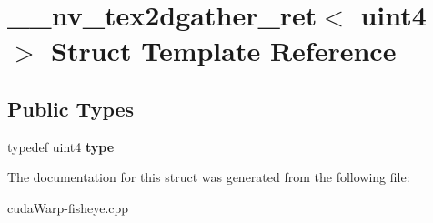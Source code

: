\hypertarget{struct____nv__tex2dgather__ret_3_01uint4_01_4}{}\section{\+\_\+\+\_\+nv\+\_\+tex2dgather\+\_\+ret$<$ uint4 $>$ Struct Template Reference}
\label{struct____nv__tex2dgather__ret_3_01uint4_01_4}
\subsection*{Public Types}
\begin{DoxyCompactItemize}
\item 
typedef uint4 {\bfseries type}\hypertarget{struct____nv__tex2dgather__ret_3_01uint4_01_4_a99f61127a9d0db131eefbe52e16344e8}{}\label{struct____nv__tex2dgather__ret_3_01uint4_01_4_a99f61127a9d0db131eefbe52e16344e8}

\end{DoxyCompactItemize}


The documentation for this struct was generated from the following file\+:\begin{DoxyCompactItemize}
\item 
cuda\+Warp-\/fisheye.\+cpp\end{DoxyCompactItemize}
